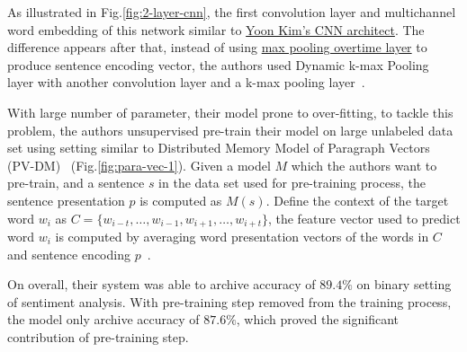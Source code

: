 As illustrated in Fig.\ref{fig:2-layer-cnn}, the first convolution layer and multichannel word embedding of this network similar to \hyperref[kim-cnn]{Yoon Kim's CNN architect}.
The difference appears after that, instead of using  \hyperref[sec:max-overtime-pooling]{max pooling overtime layer} to produce sentence encoding vector, the authors used Dynamic k-max Pooling~\cite{DCNN} layer with another convolution layer and a k-max pooling layer~\cite{DCNN}. 

With large number of parameter, their model prone to over-fitting, to tackle this problem, the authors unsupervised pre-train their model on large unlabeled data set using setting similar to Distributed Memory Model of Paragraph Vectors (PV-DM)~\cite{ParagraphVec} (Fig.\ref{fig:para-vec-1}).
Given a model \(M\) which the authors want to pre-train, and a sentence \(s\) in the data set used for pre-training process, the sentence presentation \(p\) is computed as \(M(s)\). 
Define the context of the target word \(w_i\) as \(C = \{w_{i-t},\ldots,w_{i-1}, w_{i+1},\ldots,w_{i+t}\}\), the feature vector used to predict word \(w_i\) is computed by averaging word presentation vectors of the words in \(C\) and sentence encoding \(p\)~\cite{2-layer-cnn}.
 
On overall, their system was able to archive accuracy of \(89.4\%\) on binary setting of sentiment analysis. 
With pre-training step removed from the training process, the model only archive accuracy of \(87.6\%\), which proved the significant contribution of pre-training step.~\cite{2-layer-cnn}
